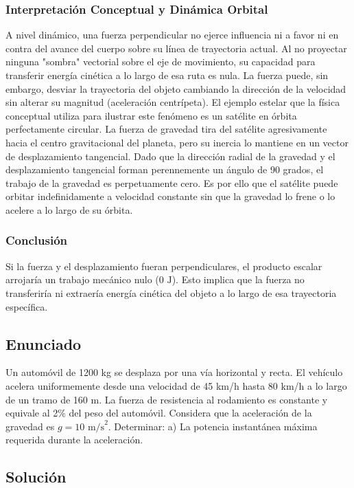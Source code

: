 \documentclass[a4paper,12pt]{article}
\begin{document}
\subsubsection*{Interpretación Conceptual y Dinámica Orbital}
A nivel dinámico, una fuerza perpendicular no ejerce influencia ni a favor ni en contra del avance del cuerpo sobre su línea de trayectoria actual. Al no proyectar ninguna "sombra" vectorial sobre el eje de movimiento, su capacidad para transferir energía cinética a lo largo de esa ruta es nula. La fuerza puede, sin embargo, desviar la trayectoria del objeto cambiando la dirección de la velocidad sin alterar su magnitud (aceleración centrípeta).
El ejemplo estelar que la física conceptual utiliza para ilustrar este fenómeno es un satélite en órbita perfectamente circular. La fuerza de gravedad tira del satélite agresivamente hacia el centro gravitacional del planeta, pero su inercia lo mantiene en un vector de desplazamiento tangencial. Dado que la dirección radial de la gravedad y el desplazamiento tangencial forman perennemente un ángulo de 90 grados, el trabajo de la gravedad es perpetuamente cero. Es por ello que el satélite puede orbitar indefinidamente a velocidad constante sin que la gravedad lo frene o lo acelere a lo largo de su órbita.

\subsubsection*{Conclusión}
Si la fuerza y el desplazamiento fueran perpendiculares, el producto escalar arrojaría un trabajo mecánico nulo ($0\text{ J}$). Esto implica que la fuerza no transferiría ni extraería energía cinética del objeto a lo largo de esa trayectoria específica.

\newpage

\subsection*{Enunciado}
Un automóvil de 1200 kg se desplaza por una vía horizontal y recta. El vehículo acelera uniformemente desde una velocidad de 45 km/h hasta 80 km/h a lo largo de un tramo de 160 m. La fuerza de resistencia al rodamiento es constante y equivale al 2\% del peso del automóvil. Considera que la aceleración de la gravedad es $g = 10\text{ m/s}^2$. 
Determinar:
a) La potencia instantánea máxima requerida durante la aceleración.

\subsection*{Solución}
\end{document}
